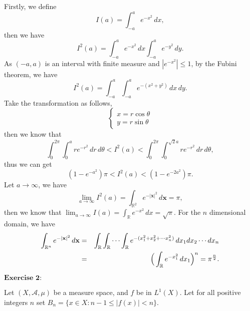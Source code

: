 \documentclass[12pt,a4paper]{ctexart}
\begin{document}
Firstly, we define 
\begin{equation*}
    I(a) = \int_{-a}^{a} e^{- x^{2}} \, d x,
\end{equation*}
then we have
\begin{equation*}
    I^{2}(a) = \int_{-a}^{a} e^{- x^{2}} \, d x \int_{-a}^{a} e^{- y^{2}} \, d y.
\end{equation*}
As $(-a, a)$ is an interval with finite measure and $|e^{-x^{2}}| \leq 1$, by the Fubini theorem, we have
\begin{equation*}
    I^{2}(a) = \int_{-a}^{a} \int_{-a}^{a} e^{- (x^{2}+y^{2})} \, d x \, d y.
\end{equation*}
Take the transformation as follows,
\begin{equation*}
\left\{
             \begin{array}{cl}
             x = r \cos \theta \\
             y = r \sin \theta 
             \end{array}
\right.
\end{equation*}
then we know that
\begin{equation*}
    \int_{0}^{2 \pi} \int_{0}^{a} r e^{-r^{2}} \, d r\, d \theta < I^{2}(a) < \int_{0}^{2 \pi} \int_{0}^{\sqrt{2} a} r e^{-r^{2}}  \, d r \, d \theta,
\end{equation*}
thus we can get
\begin{equation*}
    (1 - e^{- a^{2}}) \pi < I^{2}(a) < (1 - e^{- 2a^{2}}) \pi .
\end{equation*}
Let $a \to \infty$, we have \begin{equation*}
    \lim_{a \to \infty} I^{2}(a) = \int_{\mathbb{R}^{2}}^{} e^{- |\textbf{x}|^{2}} \, d \textbf{x} = \pi,
\end{equation*}
then we know that $\lim_{a \to \infty} I(a) = \int_{\mathbb{R}}^{} e^{- x^{2}} \, d x = \sqrt{\pi}$. For the $n$ dimensional domain, we have
\begin{eqnarray*}
    \int_{\mathbb{R}^{n}}^{} e^{- |\textbf{x}|^{2}} \, d \textbf{x} & = & \int_{\mathbb{R}}^{} \int_{\mathbb{R}}^{} \cdots \int_{\mathbb{R}}^{} e^{- (x_{1}^{2} + x_{2}^{2} + \cdots x_{n}^{2})} \, d x_{1} d x_{2} \cdots d x_{n} \\
    & = & \Big{(} \int_{\mathbb{R}}^{} e^{- x_{1}^{2} } \, d x_{1} \Big{)}^{n} = \pi^{\frac{n}{2}}.
\end{eqnarray*}

\newpage

$\textbf{Exercise 2:}$

Let $(X, \mathcal{A}, \mu)$ be a measure space, and $f$ be in $L^{1}(X)$. Let for all positive integers $n$ set $B_{n} = \{x \in X: n-1 \leq |f(x)| < n \}$.
\end{document}
